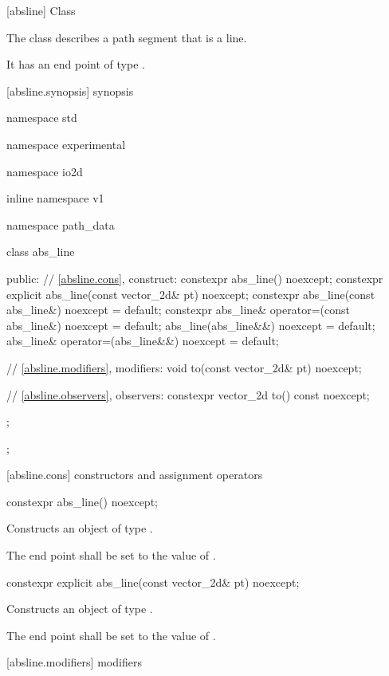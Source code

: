  [absline] {Class }

\pnum
{}
The class  describes a path segment that is a line.

\pnum
It has an end point of type .

 [absline.synopsis] { synopsis}

\begin{codeblock}
namespace std { namespace experimental { namespace io2d { inline namespace v1 {
  namespace path_data {
    class abs_line {
    public:
      // \ref{absline.cons}, construct:
      constexpr abs_line() noexcept;
      constexpr explicit abs_line(const vector_2d& pt) noexcept;
      constexpr abs_line(const abs_line&) noexcept = default;
      constexpr abs_line& operator=(const abs_line&) noexcept = default;
      abs_line(abs_line&&) noexcept = default;
      abs_line& operator=(abs_line&&) noexcept = default;

      // \ref{absline.modifiers}, modifiers:
      void to(const vector_2d& pt) noexcept;

      // \ref{absline.observers}, observers:
      constexpr vector_2d to() const noexcept;
    };
  };
} } } }
\end{codeblock}

 [absline.cons] { constructors and assignment operators}

\begin{itemdecl}
constexpr abs_line() noexcept;
\end{itemdecl}
\begin{itemdescr}
\pnum
\effects
Constructs an object of type .

\pnum
The end point shall be set to the value of .
\end{itemdescr}

\begin{itemdecl}
constexpr explicit abs_line(const vector_2d& pt) noexcept;
\end{itemdecl}
\begin{itemdescr}
\pnum
\effects
Constructs an object of type .

\pnum
The end point shall be set to the value of .
\end{itemdescr}

 [absline.modifiers]{ modifiers}

